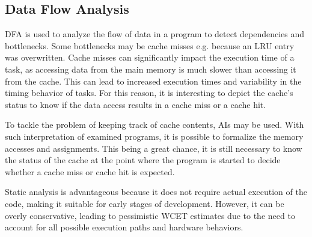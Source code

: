 \subsection{Data Flow Analysis}\label{sec:dfa}
\ac{DFA} is used to analyze the flow of data in a program to detect dependencies and bottlenecks.
Some bottlenecks may be cache misses e.g. because an \ac{LRU} entry was overwritten. 
Cache misses can significantly impact the execution time of a task, as accessing data from the main memory is much slower than accessing it from the cache\cite{liCacheModelingRealtime1996}. 
This can lead to increased execution times and variability in the timing behavior of tasks.
For this reason, it is interesting to depict the cache's status to know if the data access results in a cache miss or a cache hit.

To tackle the problem of keeping track of cache contents, \ac{AI}s may be used.
With such interpretation of examined programs, it is possible to formalize the memory accesses and assignments\cite{cousotAbstractInterpretationUnified1977}.
This being a great chance, it is still necessary to know the status of the cache at the point where the program is started to decide whether a cache miss or cache hit is expected. 

Static analysis is advantageous because it does not require actual execution of the code, making it suitable for early stages of development. However, it can be overly conservative, leading to pessimistic WCET estimates due to the need to account for all possible execution paths and hardware behaviors.

